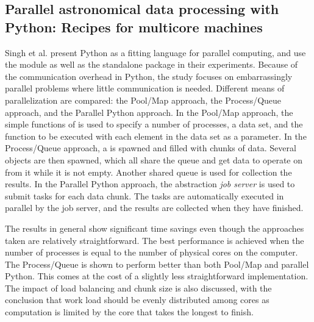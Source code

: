 \subsection{Parallel astronomical data processing with Python: Recipes for multicore machines}
Singh et al. \cite{singh_2013_parallel_padpwprfmm} present Python as a fitting language for parallel computing, and use the
 module as well as the standalone  package in their experiments. Because of the
communication overhead in Python, the study focuses on embarrassingly parallel problems where little communication is needed.
Different means of parallelization are
compared: the Pool/Map approach, the Process/Queue approach, and the Parallel Python approach. 
In the Pool/Map approach, the simple functions of  is used to specify a number of processes, a data
set, and the function to be executed with each element in the data set as a parameter. In the Process/Queue approach, a
 is spawned and filled with chunks of data. Several  objects are then
spawned, which all share the queue and get data to operate on from it while it is not empty. Another shared queue is used for
collection the results. In the Parallel Python approach, the  abstraction \emph{job server}
is used to submit tasks for each data chunk. The tasks are automatically executed in parallel by the job server, and the results
are collected when they have finished.

The results in general show significant time savings even though the approaches taken are relatively straightforward.
The best performance is achieved when the number of processes is equal to the number of physical cores on the computer.
The Process/Queue is shown to perform better than both Pool/Map and parallel Python. This comes at the cost of a slightly less
straightforward implementation. The impact of load balancing and chunk size is also discussed, with the conclusion that work load
should be evenly distributed among cores as computation is limited by the core that takes the longest to finish.


